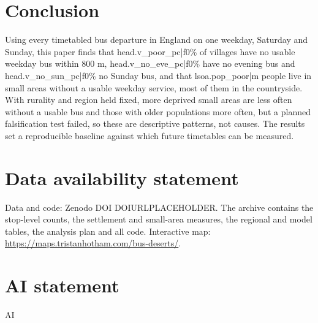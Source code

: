 \documentclass[11pt,a4paper]{article}
\begin{document}
\section{Conclusion}\label{sec:conc}
Using every timetabled bus departure in England on one weekday, Saturday and Sunday, this paper finds that {{head.v_poor_pc|f0}}\% of villages have no usable weekday bus within 800 m, {{head.v_no_eve_pc|f0}}\% have no evening bus and {{head.v_no_sun_pc|f0}}\% no Sunday bus, and that {{lsoa.pop_poor|m}} people live in small areas without a usable weekday service, most of them in the countryside. With rurality and region held fixed, more deprived small areas are less often without a usable bus and those with older populations more often, but a planned falsification test failed, so these are descriptive patterns, not causes. The results set a reproducible baseline against which future timetables can be measured.

\section*{Data availability statement}
Data and code: Zenodo DOI DOIURLPLACEHOLDER. The archive contains the stop-level counts, the settlement and small-area measures, the regional and model tables, the analysis plan and all code. Interactive map: \url{https://maps.tristanhotham.com/bus-deserts/}.

\section*{AI statement}
{{AI}}
\end{document}
